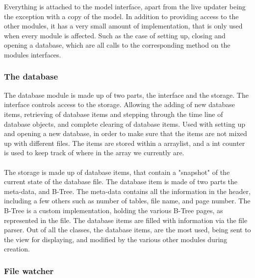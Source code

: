 Everything is attached to the model interface, apart from the live updater being the exception with a copy of the model. In addition to providing access to the other modules, it has a very small amount of implementation, that is only used when every module is affected. Such as the case of setting up, closing and opening a database, which are all calls to the corresponding method on the modules interfaces. 

\subsubsection{The database}
\label{subsubsec:databse_imp}

The database module is made up of two parts, the interface and the storage. The interface controls access to the storage. Allowing the adding of new database items, retrieving of database items and stepping through the time line of database objects, and complete clearing of database items. Used with setting up and opening a new database, in order to make sure that the items are not mixed up with different files. The items are stored within a arraylist, and a int counter is used to keep track of where in the array we currently are.
\\\\
The storage is made up of database items, that contain a "snapshot" of the current state of the database file. The database item is made of two parts the meta-data, and B-Tree. The meta-data contains all the information in the header, including a few others such as number of tables, file name, and page number. The B-Tree is a custom implementation, holding the various B-Tree pages, as represented in the file. The database items are filled with information via the file parser. Out of all the classes, the database items, are the most used, being sent to the view for displaying, and modified by the various other modules during creation. 

\subsubsection{File watcher}
\label{subsubsec:file_watcher_imp}

